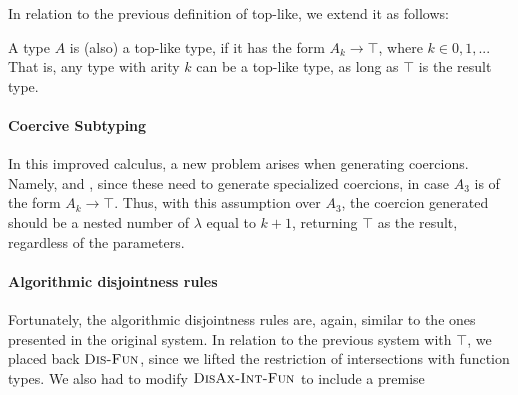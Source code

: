 In relation to the previous definition of top-like, we extend it as follows:
\begin{definition}
  
  A type $A$ is (also) a top-like type, if it has the form $A_k \to \top$, where $k \in {0,1,..}$.
  That is, any type with arity $k$ can be a top-like type, as long as $\top$ is the result type. 

\end{definition}



\paragraph{Coercive Subtyping}

In this improved calculus, a new problem arises when generating coercions. 
Namely,  and , since these need to generate specialized coercions,
in case $A_3$ is of the form $A_k \to \top$. 
Thus, with this assumption over $A_3$, the coercion generated should be a nested number of $\lambda$ equal to $k+1$,
returning $\top$ as the result, regardless of the parameters.

\paragraph{Algorithmic disjointness rules}

Fortunately, the algorithmic disjointness rules are, again, similar to the ones presented in the original system.
In relation to the previous system with $\top$, we placed back $\textsc{Dis-Fun}$, since we lifted the restriction
of intersections with function types.
We also had to modify $\textsc{DisAx-Int-Fun}$ to include a premise  
